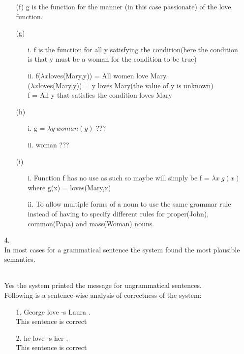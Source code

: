 \documentclass{article}
\begin{document}
\begin{enumerate}
\begin{enumerate}
        \item[(f)]g is the function for the manner (in this case passionate) of the love function.
        \item[(g)]
        \begin{enumerate}
            \item[i.] f is the function for all y satisfying the condition(here the condition is that y must be a woman for the condition to be true) 
            \item[ii.] f($\lambda x$loves(Mary,y)) = All women love Mary.
            \\($\lambda x$loves(Mary,y)) = y loves Mary(the value of y is unknown)
            \\f = All y that satisfies the condition loves Mary
        \end{enumerate}
        \item[(h)]
        \begin{enumerate}
            \item[i.]g = $\lambda y \: woman(y)$ ???
            \item [ii.]woman ???
        \end{enumerate}
        \item[(i)]
        \begin{enumerate}
            \item[i.] Function f has no use as such so maybe will simply be f = $\lambda x \: g(x)$ where g(x) = loves(Mary,x)
            \item[ii.] To allow multiple forms of a noun to use the same grammar rule instead of having to specify different rules for proper(John), common(Papa) and mass(Woman) nouns.
        \end{enumerate}
    \end{enumerate}
    \item [4.]
    \\In most cases for a grammatical sentence the system found the most plausible semantics.
    
    \\Yes the system printed the message for ungrammatical sentences.
    \\Following is a sentence-wise analysis of correctness of the system: 
    \begin{enumerate}
        \item[1.] George love -s Laura .
        \\This sentence is correct
\item[2.] he love -s her .
\\This sentence is correct


\end{enumerate}
\end{enumerate}
\end{document}
